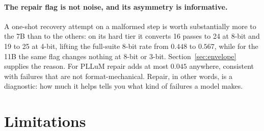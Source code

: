 \documentclass[11pt]{article}
\begin{document}
\paragraph{The repair flag is not noise, and its asymmetry is informative.} A one-shot recovery attempt on a malformed step is worth substantially more to the 7B than to the others: on its hard tier it converts 16 passes to 24 at 8-bit and 19 to 25 at 4-bit, lifting the full-suite 8-bit rate from $0.448$ to $0.567$, while for the 11B the same flag changes nothing at 8-bit or 3-bit. Section~\ref{sec:envelope} supplies the reason. For PLLuM repair adds at most $0.045$ anywhere, consistent with failures that are not format-mechanical. Repair, in other words, is a diagnostic: how much it helps tells you what kind of failures a model makes.

\section{Limitations}
\label{sec:limits}
\end{document}
